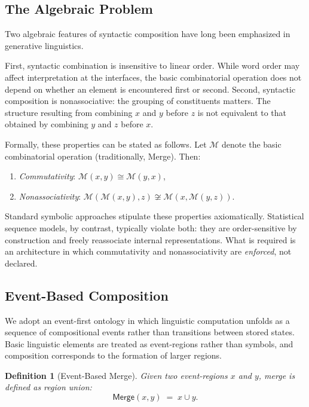 \documentclass[11pt]{article}
\newtheorem{definition}{Definition}
\begin{document}
\subsection{The Algebraic Problem}

Two algebraic features of syntactic composition have long been emphasized in generative linguistics.

First, syntactic combination is insensitive to linear order. While word order may affect interpretation at the interfaces, the basic combinatorial operation does not depend on whether an element is encountered first or second. Second, syntactic composition is nonassociative: the grouping of constituents matters. The structure resulting from combining $x$ and $y$ before $z$ is not equivalent to that obtained by combining $y$ and $z$ before $x$.

Formally, these properties can be stated as follows. Let $\mathcal{M}$ denote the basic combinatorial operation (traditionally, Merge). Then:
\begin{enumerate}
  \item \emph{Commutativity}: $\mathcal{M}(x,y) \cong \mathcal{M}(y,x)$,
  \item \emph{Nonassociativity}: $\mathcal{M}(\mathcal{M}(x,y),z) \not\cong \mathcal{M}(x,\mathcal{M}(y,z))$.
\end{enumerate}

Standard symbolic approaches stipulate these properties axiomatically. Statistical sequence models, by contrast, typically violate both: they are order-sensitive by construction and freely reassociate internal representations. What is required is an architecture in which commutativity and nonassociativity are \emph{enforced}, not declared.

\subsection{Event-Based Composition}

We adopt an event-first ontology in which linguistic computation unfolds as a sequence of compositional events rather than transitions between stored states. Basic linguistic elements are treated as event-regions rather than symbols, and composition corresponds to the formation of larger regions.

\begin{definition}[Event-Based Merge]
Given two event-regions $x$ and $y$, merge is defined as region union:
\[
\mathsf{Merge}(x,y) \;=\; x \cup y.
\]
\end{definition}
\end{document}
